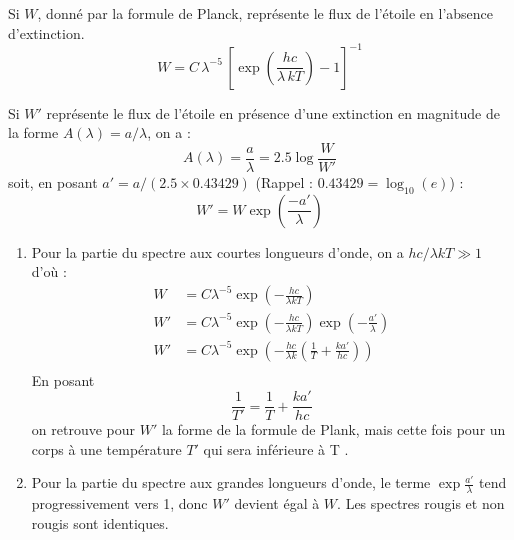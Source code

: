 \documentclass[a4paper,10pt]{report}
\begin{document}
\begin{Answer}
  Si $W$, donné par la formule de Planck, représente le flux de
  l'étoile en l'absence d'extinction.
  $$
  W =
  C\,\lambda^{-5}\,\left[\exp\left({\frac{hc}{\lambda\,kT}}\right)-1\right]^{-1}
  $$

  Si $W'$ représente le flux de l'étoile en présence d'une extinction
  en magnitude de la forme $A(\lambda) = a/\lambda$, on a :
  $$
  A(\lambda)= \frac{a}{\lambda} = 2.5 \log\frac{W}{W'}
  $$
  soit, en posant $a' = a/(2.5 \times0.43429)$ (Rappel : $0.43429 =
  \log_{10}(e)$) :
  $$
  W' = W \exp\left(\frac{-a'}{\lambda}\right)
  $$

  \begin{enumerate}
  \item Pour la partie du spectre aux courtes longueurs d'onde, on a
    $hc/\lambda kT \gg 1$ d'où :
    \begin{align*}
      W  &= C\lambda^{-5}\exp\left(-\frac{hc}{\lambda kT}\right) \\
      W' &= C\lambda^{-5}\exp\left(-\frac{hc}{\lambda
          kT}\right)\exp\left(-\frac{a'}{\lambda}\right) \\
      W' &= C\lambda^{-5}\exp\left(-\frac{hc}{\lambda
          k}\left(\frac{1}{T}+\frac{ka'}{hc}\right)\right) \\
    \end{align*}
    En posant
    $$
    \frac{1}{T'} = \frac{1}{T} + \frac{ka'}{hc}
    $$
    on retrouve pour $W'$ la forme de la formule de Plank, mais cette
    fois pour un corps à une température $T'$ qui sera inférieure à T .

  \item Pour la partie du spectre aux grandes longueurs d'onde, le
    terme $\exp\frac{a'}{\lambda}$ tend progressivement vers 1, donc
    $W'$ devient égal à $W$. Les spectres rougis et non rougis sont
    identiques.
  \end{enumerate}
\end{Answer}
\end{document}
